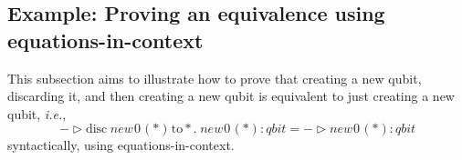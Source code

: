   \subsection{Example: Proving an equivalence using equations-in-context}

  This subsection aims to illustrate how to prove that creating a new qubit, discarding it, and then creating a new qubit is equivalent to just creating a new qubit, \textit{i.e.},
  \begin{equation}
    - \triangleright \text{disc} \hspace{3pt} \textit{new}\hspace{1pt}0 \hspace{1pt}(*) \hspace{1pt} \text{to} *. \hspace{3pt} \textit{new}\hspace{1pt}0 \hspace{1pt}(*): \textit{qbit} = - \triangleright \textit{new}\hspace{1pt}0 \hspace{1pt}(*): \textit{qbit} 
  \end{equation}
  syntactically, using equations-in-context.

